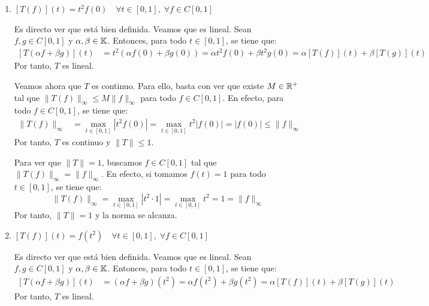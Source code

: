 \begin{ejercicio}
\begin{enumerate}
    
    Buscamos por tanto $f \in C\left[0, 1\right]$ tal que $\|T(f)\|_\infty = \|f\|_\infty$. En efecto, si tomamos $f(t) = 1$ para todo $t \in \left[0, 1\right]$, se tiene que:
    \begin{equation*}
        \|T(f)\|_\infty = \max_{t \in \left[0, 1\right]} \left|\int_{0}^t 1\,ds\right| = \max_{t \in \left[0, 1\right]} t = 1 = \|f\|_\infty
    \end{equation*}
    Por tanto, $\|T\| \geq 1$, y por tanto $\|T\| = 1$. Notemos además que, en este caso, la norma se alcanza.
    \item $\left[T(f)\right](t) = t^2 f(0) \quad \forall t \in \left[0, 1\right], \; \forall f \in C\left[0, 1\right]$
    
    Es directo ver que está bien definida. Veamos que es lineal. Sean $f, g \in C\left[0, 1\right]$ y $\alpha, \beta \in \mathbb{K}$. Entonces, para todo $t \in \left[0, 1\right]$, se tiene que:
    \begin{align*}
        \left[T(\alpha f + \beta g)\right](t) &= t^2 (\alpha f(0) + \beta g(0)) = \alpha t^2 f(0) + \beta t^2 g(0) = \alpha \left[T(f)\right](t) + \beta \left[T(g)\right](t)
    \end{align*}
    Por tanto, $T$ es lineal.

    Veamos ahora que $T$ es continuo. Para ello, basta con ver que existe $M \in \mathbb{R}^+$ tal que $\|T(f)\|_\infty \leq M \|f\|_\infty$ para todo $f \in C\left[0, 1\right]$. En efecto, para todo $f \in C\left[0, 1\right]$, se tiene que:
    \begin{align*}
        \|T(f)\|_\infty &= \max_{t \in \left[0, 1\right]} |t^2 f(0)| = \max_{t \in \left[0, 1\right]} t^2 |f(0)| = |f(0)| \leq \|f\|_\infty
    \end{align*}
    Por tanto, $T$ es continuo y $\|T\| \leq 1$.

    Para ver que $\|T\| = 1$, buscamos $f \in C\left[0, 1\right]$ tal que $\|T(f)\|_\infty = \|f\|_\infty$. En efecto, si tomamos $f(t) = 1$ para todo $t \in \left[0, 1\right]$, se tiene que:
    \begin{equation*}
        \|T(f)\|_\infty = \max_{t \in \left[0, 1\right]} |t^2 \cdot 1| = \max_{t \in \left[0, 1\right]} t^2 = 1 = \|f\|_\infty
    \end{equation*}
    Por tanto, $\|T\| = 1$ y la norma se alcanza.
    \item $\left[T(f)\right](t) = f(t^2) \quad \forall t \in \left[0, 1\right], \; \forall f \in C\left[0, 1\right]$
    
    Es directo ver que está bien definida. Veamos que es lineal. Sean $f, g \in C\left[0, 1\right]$ y $\alpha, \beta \in \mathbb{K}$. Entonces, para todo $t \in \left[0, 1\right]$, se tiene que:
    \begin{align*}
        \left[T(\alpha f + \beta g)\right](t) &= (\alpha f + \beta g)(t^2) = \alpha f(t^2) + \beta g(t^2) = \alpha \left[T(f)\right](t) + \beta \left[T(g)\right](t)
    \end{align*}
    Por tanto, $T$ es lineal.


\end{enumerate}
\end{ejercicio}
